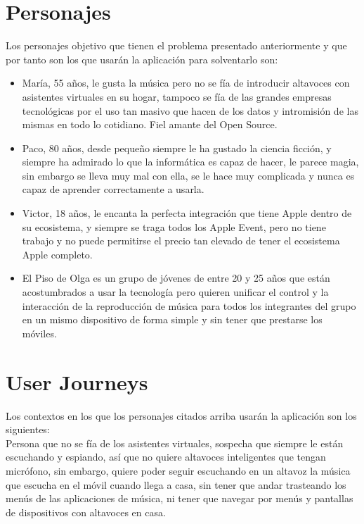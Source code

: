 \section{Personajes}
Los personajes objetivo que tienen el problema presentado anteriormente y que por tanto son los que usarán la aplicación para solventarlo son:
\begin{itemize}
    \item María, 55 años, le gusta la música pero no se fía de introducir altavoces con asistentes virtuales en su hogar, tampoco se fía de las grandes empresas tecnológicas por el uso tan masivo que hacen de los datos y intromisión de las mismas en todo lo cotidiano. Fiel amante del Open Source.
    \item Paco, 80 años, desde pequeño siempre le ha gustado la ciencia ficción, y siempre ha admirado lo que la informática es capaz de hacer, le parece magia, sin embargo se lleva muy mal con ella, se le hace muy complicada y nunca es capaz de aprender correctamente a usarla.
    \item Victor, 18 años, le encanta la perfecta integración que tiene Apple dentro de su ecosistema, y siempre se traga todos los Apple Event, pero no tiene trabajo y no puede permitirse el precio tan elevado de tener el ecosistema Apple completo.
    \item El Piso de Olga es un grupo de jóvenes de entre 20 y 25 años que están acostumbrados a usar la tecnología pero quieren unificar el control y la interacción de la reproducción de música para todos los integrantes del grupo en un mismo dispositivo de forma simple y sin tener que prestarse los móviles.
\end{itemize}

\section{User Journeys}
Los contextos en los que los personajes citados arriba usarán la aplicación son los siguientes:\\

Persona que no se fía de los asistentes virtuales, sospecha que siempre le están escuchando y espiando, así que no quiere altavoces inteligentes que tengan micrófono, sin embargo, quiere poder seguir escuchando en un altavoz la música que escucha en el móvil cuando llega a casa, sin tener que andar trasteando los menús de las aplicaciones de música, ni tener que navegar por menús y pantallas de dispositivos con altavoces en casa.\\

